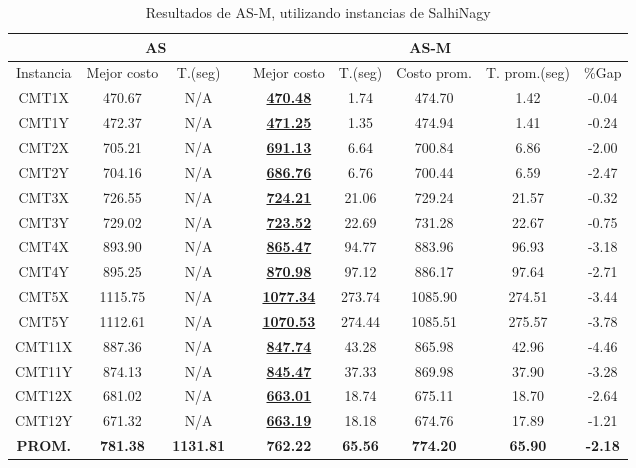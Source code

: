 \begin{table}[h]
\caption{ Resultados de AS-M, utilizando instancias de SalhiNagy}
\centering
\scriptsize
\begin{tabular*}{1.00\textwidth}{@{\extracolsep{\fill}} |c||c c||c c c c c c|}
\hline
 & \multicolumn{2}{c||}{\bf{AS}} & \multicolumn{6}{c|}{\bf{AS-M}}\\\hline
Instancia & Mejor costo & T.(seg) & & Mejor costo & T.(seg) & Costo prom. & T. prom.(seg) & \%Gap\\ [0.5ex]
\hline\hline
CMT1X & 470.67 & N/A & & \bf{\underline{470.48}} & 
1.74 & 474.70 & 1.42 & -0.04\\CMT1Y & 472.37 & N/A & & \bf{\underline{471.25}} & 
1.35 & 474.94 & 1.41 & -0.24\\CMT2X & 705.21 & N/A & & \bf{\underline{691.13}} & 
6.64 & 700.84 & 6.86 & -2.00\\CMT2Y & 704.16 & N/A & & \bf{\underline{686.76}} & 
6.76 & 700.44 & 6.59 & -2.47\\CMT3X & 726.55 & N/A & & \bf{\underline{724.21}} & 
21.06 & 729.24 & 21.57 & -0.32\\CMT3Y & 729.02 & N/A & & \bf{\underline{723.52}} & 
22.69 & 731.28 & 22.67 & -0.75\\CMT4X & 893.90 & N/A & & \bf{\underline{865.47}} & 
94.77 & 883.96 & 96.93 & -3.18\\CMT4Y & 895.25 & N/A & & \bf{\underline{870.98}} & 
97.12 & 886.17 & 97.64 & -2.71\\CMT5X & 1115.75 & N/A & & \bf{\underline{1077.34}} & 
273.74 & 1085.90 & 274.51 & -3.44\\CMT5Y & 1112.61 & N/A & & \bf{\underline{1070.53}} & 
274.44 & 1085.51 & 275.57 & -3.78\\CMT11X & 887.36 & N/A & & \bf{\underline{847.74}} & 
43.28 & 865.98 & 42.96 & -4.46\\CMT11Y & 874.13 & N/A & & \bf{\underline{845.47}} & 
37.33 & 869.98 & 37.90 & -3.28\\CMT12X & 681.02 & N/A & & \bf{\underline{663.01}} & 
18.74 & 675.11 & 18.70 & -2.64\\CMT12Y & 671.32 & N/A & & \bf{\underline{663.19}} & 
18.18 & 674.76 & 17.89 & -1.21\\\hline\hline\bf{PROM.} & 
\bf{781.38} & \bf{1131.81} & & \bf{762.22} & \bf{65.56} & \bf{774.20} & \bf{65.90} & \bf{-2.18}\\[1ex]\hline
\end{tabular*}
\label{table:aco-finalS}
\end{table}

